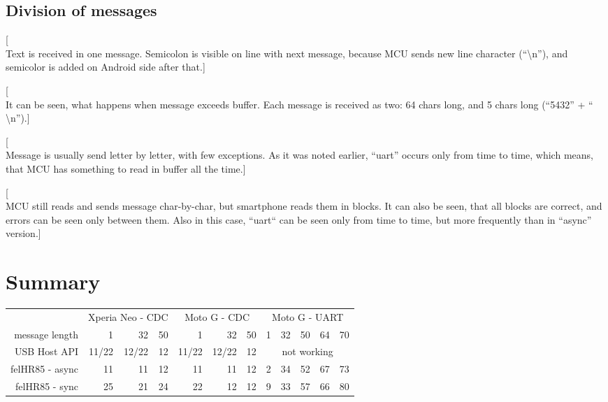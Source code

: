 \clearpage

\subsection{Division of messages}

[\\Text is received in one message. 
Semicolon is visible on line with next message, because MCU sends new line
character (``\textbackslash n''), and semicolor is added on Android side after that.]

[\\It can be seen, what happens when message exceeds buffer.
Each message is received as two:
64 chars long, and 5 chars long (``5432'' + `` \textbackslash n'').]

[\\Message is usually send letter by letter, with few exceptions.
As it was noted earlier, ``uart'' occurs only from time to time, which means,
that MCU has something to read in buffer all the time.]

[\\MCU still reads and sends message char-by-char, but smartphone reads them in
blocks. 
It can also be seen, that all blocks are correct, and errors can be
seen only between them. 
Also in this case, ``uart`` can be seen only from time to time, but more
frequently than in ``async'' version.]


\clearpage

\section{Summary}

\begin{center}
\begin{tabular}{r|r|r|r|r|r|r|r|r|r|r|r}
& \multicolumn{3}{c|}{Xperia Neo - CDC} & \multicolumn{3}{c|}{Moto G - CDC} &
\multicolumn{5}{c}{Moto G - UART} \\
message length & 1 & 32 & \hspace{3ex}50 & 
1 & 32 & \hspace{3ex}50 & \hspace{1ex}1 & 
32 & 50 & 64 & 70
\\
\hline
USB Host API & 
11/22 & 12/22 & 12 & 11/22 & 12/22 & 12 &
\multicolumn{5}{c}{\cellcolor{red!50}not working}
\\
felHR85 - async & 
11 & 11 & 12 & 11 & 11 & 12 & 2 & 34 & 52 & 67 & 73 \\
felHR85 - sync & 
25 & 21 & 24 & 22 & 12 & 12 &
9 & 33 & \cellcolor{yellow!50}57 & 66 & \cellcolor{yellow!50}80
\end{tabular}
\end{center}